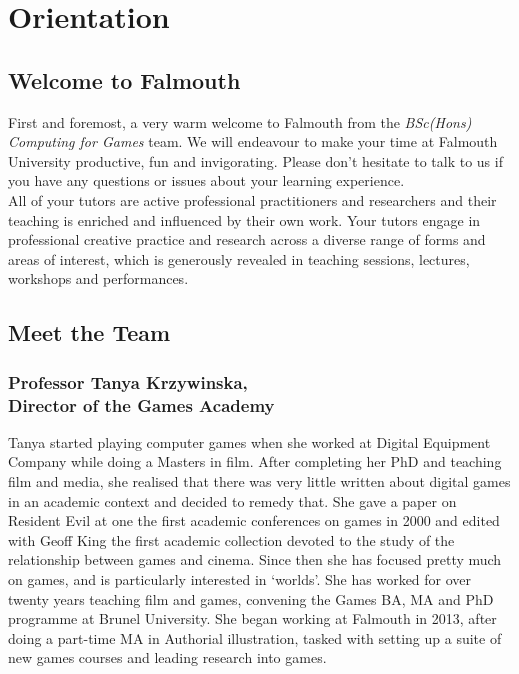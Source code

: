 \chapter{Orientation}
\newpage

\section{Welcome to Falmouth}

First and foremost, a very warm welcome to Falmouth from the \textit{BSc(Hons) Computing for Games} team. We will endeavour to make your time at Falmouth University productive, fun and invigorating. Please don't hesitate to talk to us if you have any questions or issues about your learning experience. \\

All of your tutors are active professional practitioners and researchers and their teaching is enriched and influenced by their own work. Your tutors engage in professional creative practice and research across a diverse range of forms and areas of interest, which is generously revealed in teaching sessions, lectures, workshops and performances.

\section{Meet the Team}

\subsection[Tanya Krzywinska]{Professor Tanya Krzywinska,\\ Director of the Games Academy}

Tanya started playing computer games when she worked at Digital Equipment Company while doing a Masters in film.  After completing her PhD and teaching film and media, she realised that there was very little written about digital games in an academic context and decided to remedy that.  She gave a paper on Resident Evil at one the first academic conferences on games in 2000 and edited with Geoff King the first academic collection devoted to the study of the relationship between games and cinema. Since then she has focused pretty much on games, and is particularly interested in ‘worlds’. She has worked for over twenty years teaching film and games, convening the Games BA, MA and PhD programme at Brunel University. She began working at Falmouth in 2013, after doing a part-time MA in Authorial illustration, tasked with setting up a suite of new games courses and leading research into games. \\


